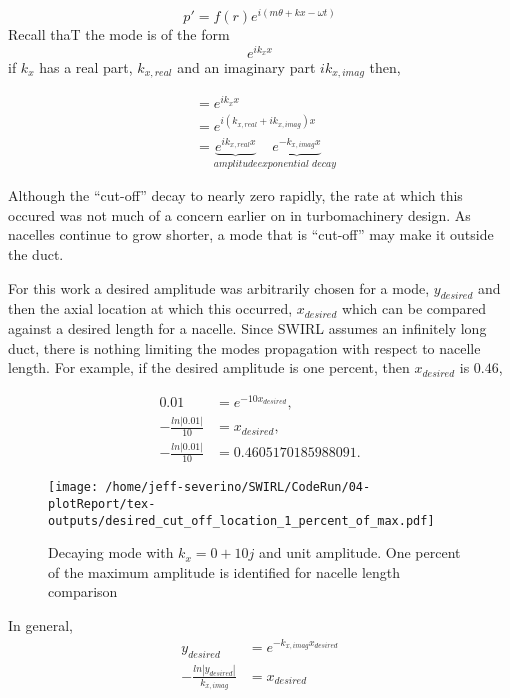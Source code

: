 
\begin{equation}
    p' = f(r) e^{i(m \theta + k x - \omega t)}
\end{equation}
Recall thaT the mode is of the 
form 
\begin{equation}
    e^{i k_x x}
    \label{eqn:fluctuationexample}
\end{equation}
if $k_x$ has a real part, $k_{x,real}$ and an imaginary part $i k_{x,imag}$ 
then,

\begin{align}
    &= e^{i k_x x} \\
    &= e^{i (k_{x,real}+ i k_{x,imag}) x} \\
    &= \underbrace{e^{i k_{x,real}x}}_{\textit{amplitude}} \underbrace{e^{- k_{x,imag} x}}_{\textit{exponential decay}} 
\end{align}

Although the ``cut-off'' decay to nearly zero rapidly, the rate at which this occured
was not much of a concern earlier on in turbomachinery design. As nacelles 
continue to grow shorter, a mode that is ``cut-off'' may make it outside the duct.

For this work a desired amplitude was arbitrarily chosen for a mode, $y_{desired}$
and then the axial location at which this occurred, $x_{desired}$ which 
can be compared against a desired length for a nacelle.  
Since SWIRL assumes an infinitely long duct, there is nothing limiting the 
modes propagation with respect to nacelle length. For example, if the 
desired amplitude is one percent, then $x_{desired}$ is $0.46$, 

\begin{align*}
    0.01 &=  e^{-10 x_{desired}},\\
    -\frac{ln|0.01|}{10} &=  x_{desired},\\
    -\frac{ln|0.01|}{10} &= 0.4605170185988091 .
\end{align*}


 \begin{figure}
     \centering
     \texttt{[image: /home/jeff-severino/SWIRL/CodeRun/04-plotReport/tex-outputs/desired\_cut\_off\_location\_1\_percent\_of\_max.pdf]}
     \caption{Decaying mode with $k_x = 0 + 10j$ and unit amplitude. One percent
     of the maximum amplitude is identified for nacelle length comparison}
     \label{fig:decaying_mode_with_1_percent_amp}
 \end{figure}
 
 
In general,
\begin{align*}
    y_{desired} &=  e^{-k_{x,imag} x_{desired} }\\
    -\frac{ln|y_{desired}|}{k_{x,imag}} &=  x_{desired}
\end{align*}
